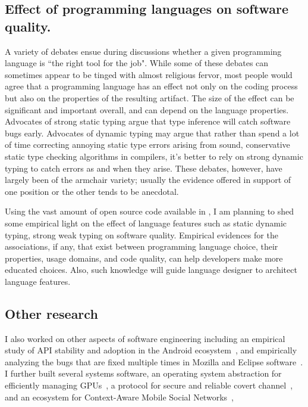 \documentclass[a4paper, 11pt]{article}
\begin{document}
\begin{small}
\section*{\small Effect of programming languages on software quality.}
A variety of debates ensue during discussions whether a given programming language is ``the
right tool for the job". While some of these debates can sometimes appear to be tinged with
almost religious fervor, most people would agree that a programming language has an effect not
only on the coding process but also on the properties of the resulting artifact. The size of
the effect can be significant and important overall, and can depend on the language
properties. Advocates of strong static typing argue that type inference will catch software bugs early.
Advocates of dynamic typing may argue that rather than spend a lot of time correcting annoying
static type errors arising from sound, conservative static type checking algorithms in
compilers, it's better to rely on strong dynamic typing to catch errors as and when they arise.
These debates, however, have largely been of the armchair variety; usually the evidence offered
in support of one position or the other tends to be anecdotal. 

Using the vast amount of open source code available  in \gh, I am planning to shed some empirical light 
on the effect of language features such as static \vs dynamic typing, strong \vs weak typing on software quality. 
Empirical evidences for the associations,  if any,  that exist between programming language
choice, their properties, usage domains, and code quality, can help developers make more
educated choices. Also, such knowledge will guide language designer to architect language features.

\subsection*{\small Other research} I also worked on other aspects of software engineering including 
an empirical study of API stability and adoption in the Android ecosystem~\cite{mcdonnell2013empirical}, 
and empirically analyzing the bugs that are fixed multiple times in Mozilla and Eclipse software~\cite{park2012empirical}.
I further built several systems software, \eg an operating system abstraction for efficiently managing GPUs~\cite{rossbach2011ptask}, 
 a protocol for secure and reliable covert channel~\cite{ray2008protocol}, and an ecosystem for Context-Aware Mobile Social Networks~\cite{beach2008whozthat, beach2009touch}, 


\end{small}
\end{document}
